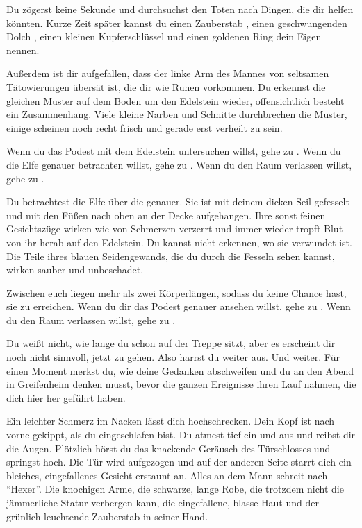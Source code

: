 
Du zögerst keine Sekunde und durchsuchst den Toten nach Dingen, die dir helfen könnten.
Kurze Zeit später kannst du einen Zauberstab , einen geschwungenden Dolch , einen kleinen Kupferschlüssel  und einen goldenen Ring  dein Eigen nennen.

Außerdem ist dir aufgefallen, dass der linke Arm des Mannes von seltsamen Tätowierungen übersät ist, die dir wie Runen vorkommen. Du erkennst die gleichen Muster auf dem Boden um den Edelstein wieder, offensichtlich besteht ein Zusammenhang. Viele kleine Narben und Schnitte durchbrechen die Muster, einige scheinen noch recht frisch und gerade erst verheilt zu sein.

Wenn du das Podest mit dem Edelstein untersuchen willst, gehe zu .
Wenn du die Elfe genauer betrachten willst, gehe zu .
Wenn du den Raum verlassen willst, gehe zu .


Du betrachtest die Elfe über die genauer. Sie ist mit deinem dicken Seil gefesselt und mit den Füßen nach oben an der Decke aufgehangen. Ihre sonst feinen Gesichtszüge wirken wie von Schmerzen verzerrt und immer wieder tropft Blut von ihr herab auf den Edelstein.
Du kannst nicht erkennen, wo sie verwundet ist.
Die Teile ihres blauen Seidengewands, die du durch die Fesseln sehen kannst, wirken sauber und unbeschadet.

Zwischen euch liegen mehr als zwei Körperlängen, sodass du keine Chance hast, sie zu erreichen. Wenn du dir das Podest genauer ansehen willst, gehe zu .
Wenn du den Raum verlassen willst, gehe zu .


Du weißt nicht, wie lange du schon auf der Treppe sitzt, aber es erscheint dir noch nicht sinnvoll, jetzt zu gehen. Also harrst du weiter aus. Und weiter. Für einen Moment merkst du, wie deine Gedanken abschweifen und du an den Abend in Greifenheim denken musst, bevor die ganzen Ereignisse ihren Lauf nahmen, die dich hier her geführt haben.

Ein leichter Schmerz im Nacken lässt dich hochschrecken. Dein Kopf ist nach vorne gekippt, als du eingeschlafen bist. Du atmest tief ein und aus und reibst dir die Augen. Plötzlich hörst du das knackende Geräusch des Türschlosses und springst hoch. Die Tür wird aufgezogen und auf der anderen Seite starrt dich ein bleiches, eingefallenes Gesicht erstaunt an. Alles an dem Mann schreit nach ``Hexer''. Die knochigen Arme, die schwarze, lange Robe, die trotzdem nicht die jämmerliche Statur verbergen kann, die eingefallene, blasse Haut und der grünlich leuchtende Zauberstab in seiner Hand.


